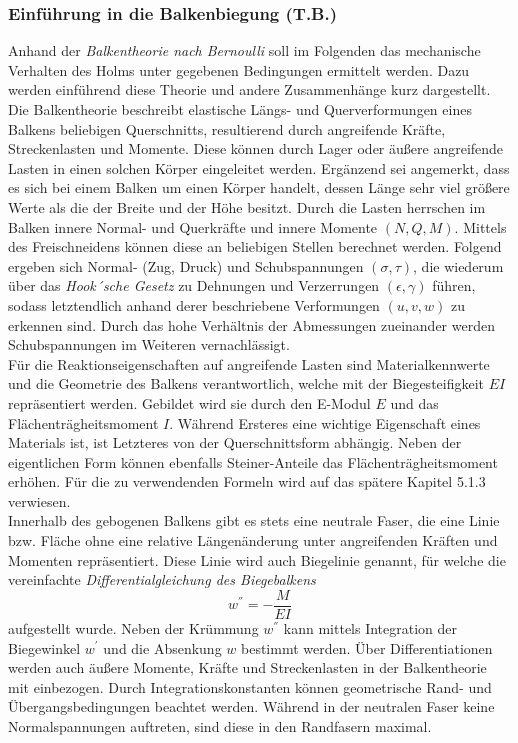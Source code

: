 \subsubsection{Einführung in die Balkenbiegung (T.B.)}
Anhand der \textit{Balkentheorie nach Bernoulli} soll im Folgenden das mechanische Verhalten des Holms unter gegebenen Bedingungen ermittelt werden. Dazu werden einführend diese Theorie und andere Zusammenhänge kurz dargestellt.\\

\noindent Die Balkentheorie beschreibt elastische Längs- und Querverformungen eines Balkens beliebigen Querschnitts, resultierend durch angreifende Kräfte, Streckenlasten und Momente. Diese können durch Lager oder äußere angreifende Lasten in einen solchen Körper eingeleitet werden. Ergänzend sei angemerkt, dass es sich bei einem Balken um einen Körper handelt, dessen Länge sehr viel größere Werte als die der Breite und der Höhe besitzt. Durch die Lasten herrschen im Balken innere Normal- und Querkräfte und innere Momente $(N, Q, M)$. Mittels des Freischneidens können diese an beliebigen Stellen berechnet werden. Folgend ergeben sich Normal- (Zug, Druck) und Schubspannungen $(\sigma, \tau)$, die wiederum über das \textit{Hook´sche Gesetz} zu Dehnungen und Verzerrungen $(\epsilon, \gamma)$ führen, sodass letztendlich anhand derer beschriebene Verformungen $(u, v, w)$ zu erkennen sind. Durch das hohe Verhältnis der Abmessungen zueinander werden Schubspannungen im Weiteren vernachlässigt. \\

\noindent Für die Reaktionseigenschaften auf angreifende Lasten sind Materialkennwerte und die Geometrie des Balkens verantwortlich, welche mit der Biegesteifigkeit $EI$ repräsentiert werden. Gebildet wird sie durch den E-Modul $E$ und das Flächenträgheitsmoment $I$. Während Ersteres eine wichtige Eigenschaft eines Materials ist, ist Letzteres von der Querschnittsform abhängig. Neben der eigentlichen Form können ebenfalls Steiner-Anteile das Flächenträgheitsmoment erhöhen. Für die zu verwendenden Formeln wird auf das spätere Kapitel 5.1.3 verwiesen.\\


\noindent Innerhalb des gebogenen Balkens gibt es stets eine neutrale Faser, die eine Linie bzw. Fläche ohne eine relative Längenänderung unter angreifenden Kräften und Momenten repräsentiert. Diese Linie wird auch Biegelinie genannt, für welche die vereinfachte \textit{Differentialgleichung des Biegebalkens}
\begin{equation}
	w^{''}=-\frac{M}{EI}
\end{equation}
aufgestellt wurde. Neben der Krümmung $w^{''}$ kann mittels Integration der Biegewinkel $w^{'}$ und die Absenkung $w$ bestimmt werden. Über Differentiationen werden auch äußere Momente, Kräfte und Streckenlasten in der Balkentheorie mit einbezogen. Durch Integrationskonstanten können geometrische Rand- und Übergangsbedingungen beachtet werden. Während in der neutralen Faser keine Normalspannungen auftreten, sind diese in den Randfasern maximal.\\

